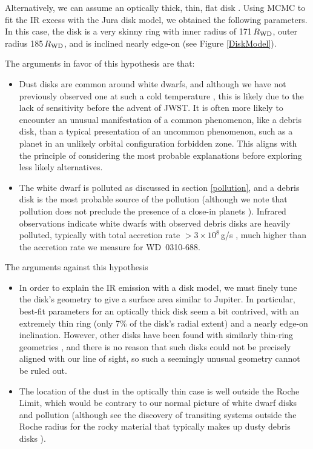 \documentclass[twocolumn]{aastex631}
\begin{document}
 

Alternatively, we can assume an optically thick, thin, flat disk \citep{2003ApJ...584L..91J}. Using MCMC to fit the IR excess with the Jura disk model, we obtained the following parameters. In this case, the disk is a very skinny ring with inner radius of 171\,$R_{\rm WD}$, outer radius 185\,$R_{\rm WD}$, and is inclined nearly edge-on (see Figure \ref{DiskModel}). 

The arguments in favor of this hypothesis are that: 
\begin{itemize}
    \item Dust disks are common around white dwarfs, and although we have not previously observed one at such a cold temperature \citep{2010ApJ...714.1386F}, this is likely due to the lack of sensitivity before the advent of JWST. It is often more likely to encounter an unusual manifestation of a common phenomenon, like a debris disk, than a typical presentation of an uncommon phenomenon, such as a planet in an unlikely orbital configuration forbidden zone. This aligns with the principle of considering the most probable explanations before exploring less likely alternatives.
    \item  The white dwarf is polluted as discussed in section \ref{pollution}, and a debris disk is the most probable source of the pollution (although we note that pollution does not preclude the presence of a close-in planets \citealt{2019Natur.576...61G}). {Infrared observations indicate white dwarfs with observed} debris disks are heavily polluted, typically with total accretion rate $>3\times10^8$\,g/s \citep{2009ApJ...694..805F}, much higher than the accretion rate we measure for WD~0310-688.
\end{itemize}
The arguments against this hypothesis
\begin{itemize}
    \item In order to explain the IR emission with a disk model, we must finely tune the disk's geometry to give a surface area similar to Jupiter. In particular, best-fit parameters for an optically thick disk seem a bit contrived, with an extremely thin ring (only 7\% of the disk's radial extent) and a nearly edge-on inclination. However, other disks have been found with similarly thin-ring geometries \citep{2022ApJ...939..108B}, and there is no reason that such disks could not be precisely aligned with our line of sight, so such a seemingly unusual geometry cannot be ruled out.   
    \item  The location of the dust in the optically thin case is well outside the Roche Limit, which would be contrary to our normal picture of white dwarf disks and pollution (although see the discovery of transiting systems outside the Roche radius for the rocky material that typically makes up dusty debris disks \citealt{2020ApJ...897..171V,2022MNRAS.511.1647F}). 
\end{itemize}
\end{document}
